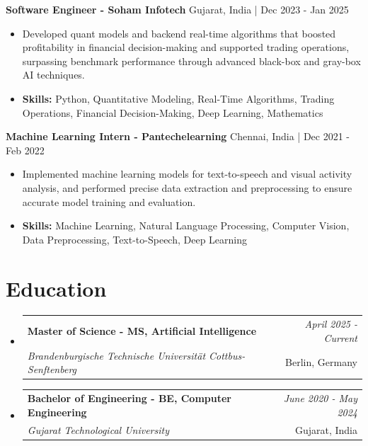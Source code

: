 \documentclass[a4paper,11pt]{article}
\makeatletter
\newcommand{\resumeSubheading}[4]{
\vspace{0.5mm}\item
    \begin{tabular*}{\linewidth}[t]{l@{\extracolsep{\fill}}r}
        \textbf{#1} & \textit{\footnotesize{#4}} \\
        \textit{\footnotesize{#3}} &  \footnotesize{#2}\\
    \end{tabular*}
    \vspace{-2.4mm}
}
\makeatother
\begin{document}
\vspace{1mm}
  \textbf{Software Engineer - Soham Infotech} \hfill Gujarat, India | Dec 2023 - Jan 2025
\vspace{-1.5mm} %
\begin{itemize}
  \item Developed quant models and backend real-time algorithms that boosted profitability in financial decision-making and supported trading operations, surpassing benchmark performance through advanced black-box and gray-box AI techniques.

\vspace{-2mm}
  \item \textbf{Skills:} Python, Quantitative Modeling, Real-Time Algorithms, Trading Operations, Financial Decision-Making, Deep Learning, Mathematics
\end{itemize}

\vspace{1mm}
  \textbf{Machine Learning Intern - Pantechelearning} \hfill Chennai, India | Dec 2021 - Feb 2022
\vspace{-1.5mm} %
\begin{itemize}
  \item Implemented machine learning models for text-to-speech and visual activity analysis, and performed precise data extraction and preprocessing to ensure accurate model training and evaluation.
\vspace{-2mm}
  \item \textbf{Skills:} Machine Learning, Natural Language Processing, Computer Vision, Data Preprocessing, Text-to-Speech, Deep Learning
\end{itemize}\section{\textbf{Education}}
\vspace{-0.4mm}

\begin{itemize}[leftmargin=0.15in, label={}]
\resumeSubheading
{Master of Science - MS, Artificial Intelligence }{Berlin, Germany}
{Brandenburgische Technische Universität Cottbus-Senftenberg  }{April 2025 - Current}

\vspace{1.0mm} %
\resumeSubheading
{Bachelor of Engineering - BE, Computer Engineering  }{Gujarat, India}
{Gujarat Technological University }{June 2020 - May 2024}

\end{itemize}
\end{document}
